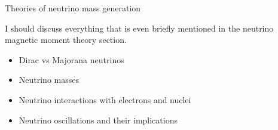 
Theories of neutrino mass generation

I should discuss everything that is even briefly mentioned in the neutrino magnetic moment theory section.
\begin{itemize}
\item Dirac vs Majorana neutrinos
\item Neutrino masses
\item Neutrino interactions with electrons and nuclei
\item Neutrino oscillations and their implications
\end{itemize}